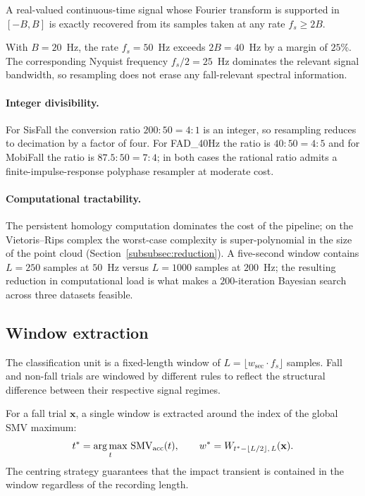 \begin{theorem}
\label{thm:nyquist}
A real-valued continuous-time signal whose Fourier transform is supported in $[-B,B]$ is exactly recovered from its samples taken at any rate $f_s\geq 2B$.
\end{theorem}

With $B=20$~Hz, the rate $f_s=50$~Hz exceeds $2B=40$~Hz by a margin of $25\%$. The corresponding Nyquist frequency $f_s/2=25$~Hz dominates the relevant signal bandwidth, so resampling does not erase any fall-relevant spectral information.

\paragraph{Integer divisibility.} For SisFall the conversion ratio $200{:}50=4{:}1$ is an integer, so resampling reduces to decimation by a factor of four. For FAD\_40Hz the ratio is $40{:}50=4{:}5$ and for MobiFall the ratio is $87.5{:}50=7{:}4$; in both cases the rational ratio admits a finite-impulse-response polyphase resampler at moderate cost.

\paragraph{Computational tractability.} The persistent homology computation dominates the cost of the pipeline; on the Vietoris--Rips complex the worst-case complexity is super-polynomial in the size of the point cloud (Section~\ref{subsubsec:reduction}). A five-second window contains $L=250$ samples at $50$~Hz versus $L=1000$ samples at $200$~Hz; the resulting reduction in computational load is what makes a $200$-iteration Bayesian search across three datasets feasible.

\subsection{Window extraction}
\label{subsubsec:windows}

The classification unit is a fixed-length window of $L=\lfloor w_{\mathrm{sec}}\cdot f_s\rfloor$ samples. Fall and non-fall trials are windowed by different rules to reflect the structural difference between their respective signal regimes.

For a fall trial $\mathbf{x}$, a single window is extracted around the index of the global SMV maximum:
\begin{equation}
  t^*=\operatorname*{arg\,max}_{t}\,\mathrm{SMV}_{\mathrm{acc}}(t),\qquad
  w^*=W_{t^*-\lfloor L/2\rfloor,\,L}(\mathbf{x}).
  \label{eq:fall-window}
\end{equation}
The centring strategy guarantees that the impact transient is contained in the window regardless of the recording length.

